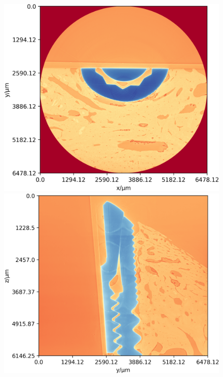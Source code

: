 \begin{figure}
\centering
\includegraphics[width=\columnwidth]{figures/770c_pag-full-xy-1x.png}
\includegraphics[width=\columnwidth]{figures/770c_pag-full-yz-1x.png}

\end{figure}
